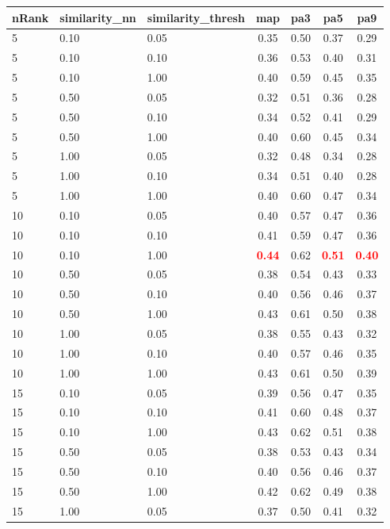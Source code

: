   
\begin{table} 
\begin{center} 
\scriptsize 
 \setlength{\tabcolsep}{.16667em} 
\begin{tabular}{lllcccc} 
nRank & similarity\_nn & similarity\_thresh & map & pa3 & pa5 & pa9 \\ 
\hline 
 5 & 0.10 & 0.05 & 0.35 & 0.50 & 0.37 & 0.29 \\ 
 5 & 0.10 & 0.10 & 0.36 & 0.53 & 0.40 & 0.31 \\ 
 5 & 0.10 & 1.00 & 0.40 & 0.59 & 0.45 & 0.35 \\ 
 5 & 0.50 & 0.05 & 0.32 & 0.51 & 0.36 & 0.28 \\ 
 5 & 0.50 & 0.10 & 0.34 & 0.52 & 0.41 & 0.29 \\ 
 5 & 0.50 & 1.00 & 0.40 & 0.60 & 0.45 & 0.34 \\ 
 5 & 1.00 & 0.05 & 0.32 & 0.48 & 0.34 & 0.28 \\ 
 5 & 1.00 & 0.10 & 0.34 & 0.51 & 0.40 & 0.28 \\ 
 5 & 1.00 & 1.00 & 0.40 & 0.60 & 0.47 & 0.34 \\ 
10 & 0.10 & 0.05 & 0.40 & 0.57 & 0.47 & 0.36 \\ 
10 & 0.10 & 0.10 & 0.41 & 0.59 & 0.47 & 0.36 \\ 
10 & 0.10 & 1.00 & \textbf{\textcolor{red}{0.44}} & 0.62 & \textbf{\textcolor{red}{0.51}} & \textbf{\textcolor{red}{0.40}} \\ 
10 & 0.50 & 0.05 & 0.38 & 0.54 & 0.43 & 0.33 \\ 
10 & 0.50 & 0.10 & 0.40 & 0.56 & 0.46 & 0.37 \\ 
10 & 0.50 & 1.00 & 0.43 & 0.61 & 0.50 & 0.38 \\ 
10 & 1.00 & 0.05 & 0.38 & 0.55 & 0.43 & 0.32 \\ 
10 & 1.00 & 0.10 & 0.40 & 0.57 & 0.46 & 0.35 \\ 
10 & 1.00 & 1.00 & 0.43 & 0.61 & 0.50 & 0.39 \\ 
15 & 0.10 & 0.05 & 0.39 & 0.56 & 0.47 & 0.35 \\ 
15 & 0.10 & 0.10 & 0.41 & 0.60 & 0.48 & 0.37 \\ 
15 & 0.10 & 1.00 & 0.43 & 0.62 & 0.51 & 0.38 \\ 
15 & 0.50 & 0.05 & 0.38 & 0.53 & 0.43 & 0.34 \\ 
15 & 0.50 & 0.10 & 0.40 & 0.56 & 0.46 & 0.37 \\ 
15 & 0.50 & 1.00 & 0.42 & 0.62 & 0.49 & 0.38 \\ 
15 & 1.00 & 0.05 & 0.37 & 0.50 & 0.41 & 0.32 \\ 

\end{tabular}
\end{center}
\end{table}

